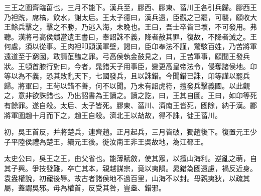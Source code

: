 三王之圍齊臨菑也，三月不能下。漢兵至，膠西、膠東、菑川王各引兵歸。膠西王乃袒跣，席槁，飲水，謝太后。王太子德曰，漢兵遠，臣觀之已罷，可襲，願收大王餘兵擊之，擊之不勝，乃逃入海，未晚也。王曰，吾士卒皆已壞，不可發用。弗聽。漢將弓高侯穨當遺王書曰，奉詔誅不義，降者赦其罪，復故，不降者滅之。王何處，須以從事。王肉袒叩頭漢軍壁，謁曰，臣卬奉法不謹，驚駭百姓，乃苦將軍遠道至于窮國，敢請菹醢之罪。弓高侯執金鼓見之，曰，王苦軍事，願聞王發兵狀。王頓首膝行對曰，今者，晁錯天子用事臣，變更高皇帝法令，侵奪諸侯地。卬等以為不義，恐其敗亂天下，七國發兵，且以誅錯。今聞錯已誅，卬等謹以罷兵歸。將軍曰，王茍以錯不善，何不以聞。乃未有詔虎符，擅發兵擊義國。以此觀之，意非欲誅錯也。乃出詔書為王讀之。讀之訖，曰，王其自圖。王曰，如卬等死有餘罪。遂自殺。太后、太子皆死。膠東、菑川、濟南王皆死，國除，納于漢。酈將軍圍趙十月而下之，趙王自殺。濟北王以劫故，得不誅，徙王菑川。

初，吳王首反，并將楚兵，連齊趙。正月起兵，三月皆破，獨趙後下。復置元王少子平陸侯禮為楚王，續元王後。徙汝南王非王吳故地，為江都王。

太史公曰，吳王之王，由父省也。能薄賦斂，使其眾，以擅山海利。逆亂之萌，自其子興。爭技發難，卒亡其本，親越謀宗，竟以夷隕。晁錯為國遠慮，禍反近身。袁盎權說，初寵後辱。故古者諸侯地不過百里，山海不以封。毋親夷狄，以疏其屬，蓋謂吳邪。毋為權首，反受其咎，豈盎、錯邪。